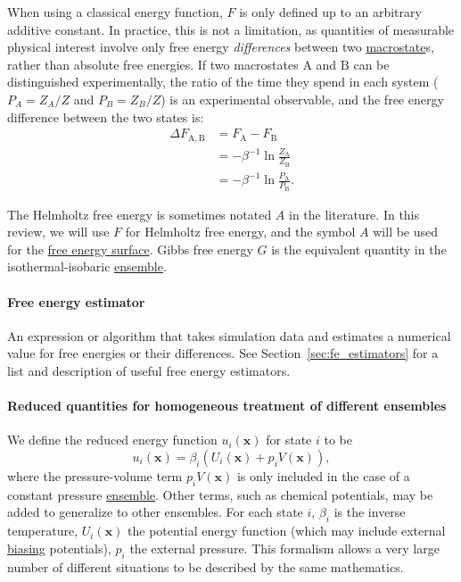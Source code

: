 \documentclass[9pt,review]{livecoms}
\newcommand{\vx}{\mathbf{x}}
\newcommand{\A}{\mathrm{A}}
\newcommand{\B}{\mathrm{B}}
\begin{document}
When using a classical energy function, $F$ is only defined up to an arbitrary additive constant.
In practice, this is not a limitation, as quantities of measurable physical interest involve only free energy \textit{differences} between two \hyperlink{ref:Macrostate} {macrostate}s, rather than absolute free energies.
If two macrostates $\A$ and $\B$ can be distinguished experimentally, the ratio of the time they spend in each system ($P_A = Z_A/Z$ and $P_B = Z_B/Z$) is an experimental observable, and the free energy difference between the two states is:
\begin{align}
  \Delta F_{\A,\B} &= F_{\A} - F_{\B} \nonumber\\
    & = -\beta^{-1} \ln \frac{Z_{\A}}{Z_{\B}} \nonumber\\
  & = -\beta^{-1} \ln \frac{P_{\A}}{P_{\B}}.
\end{align}

The Helmholtz free energy is sometimes notated $A$ in the literature. In this review, we will use $F$ for Helmholtz free energy, and the symbol $A$ will be used for the \hyperlink{ref:FES} {free energy surface}. Gibbs free energy $G$ is the equivalent quantity in the isothermal-isobaric \hyperlink{ref:Ensemble} {ensemble}.

\hypertarget{ref:FEestimator} {\paragraph{Free energy estimator}}
An expression or algorithm that takes simulation data and estimates a numerical value for free energies or their differences. See Section~\ref{sec:fe_estimators} for a list and description of useful free energy estimators.

\hypertarget{ref:reduced} {\paragraph{Reduced quantities for homogeneous treatment of different ensembles}}

We define the reduced energy function $u_i(\vx)$
for state $i$ to be
\begin{equation}
u_i(\vx) = \beta_i ( U_i(\vx) + p_i V(\vx)),
\label{equation:reduced-energy}
\end{equation}
where the pressure-volume term $p_i V(\vx)$ is only included in the case of a constant pressure \hyperlink{ref:Ensemble} {ensemble}.
Other terms, such as chemical potentials, may be added to generalize to other ensembles.
For each state $i$, $\beta_i$ is the inverse temperature, $U_i(\vx)$ the potential energy function (which may include external \hyperlink{ref:biasingE} {biasing} potentials), $p_i$ the external pressure.
This formalism allows a very large number of different
situations to be described by the same mathematics.
\end{document}
